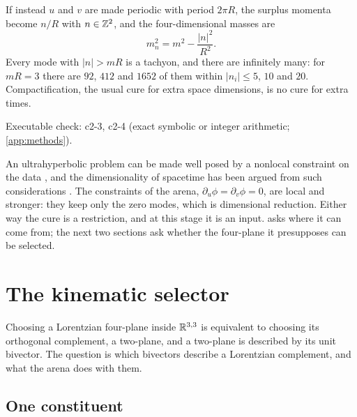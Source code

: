 \begin{example}
\label{ex:tachyons}
If instead $u$ and $v$ are made periodic with period $2\pi R$, the surplus momenta become $n/R$ with $n\in\mathbb{Z}^2$, and the four-dimensional masses are
\[
m_n^2=m^2-\frac{|n|^2}{R^2}.
\]
Every mode with $|n|>mR$ is a tachyon, and there are infinitely many: for $mR=3$ there are $92$, $412$ and $1652$ of them within $|n_i|\le5$, $10$ and $20$.
Compactification, the usual cure for extra space dimensions, is no cure for extra times.
\end{example}

\noindent Executable check: c2-3, c2-4 (exact symbolic or integer arithmetic; \cref{app:methods}).

An ultrahyperbolic problem can be made well posed by a nonlocal constraint on the data \cite{CraigWeinstein09}, and the dimensionality of spacetime has been
argued from such considerations \cite{Tegmark97}. The constraints of the arena, $\partial_u\phi=\partial_v\phi=0$, are local and stronger: they keep only the zero modes,
which is dimensional reduction. Either way the cure is a restriction, and at this stage it is an input.  asks where it can come from; the next
two sections ask whether the four-plane it presupposes can be selected.



\section{The kinematic selector}
\label{sec:selector}

Choosing a Lorentzian four-plane inside $\mathbb{R}^{3,3}$ is equivalent to choosing its orthogonal complement, a two-plane, and a two-plane is described by its unit
bivector. The question is which bivectors describe a Lorentzian complement, and what the arena does with them.

\subsection{One constituent}

